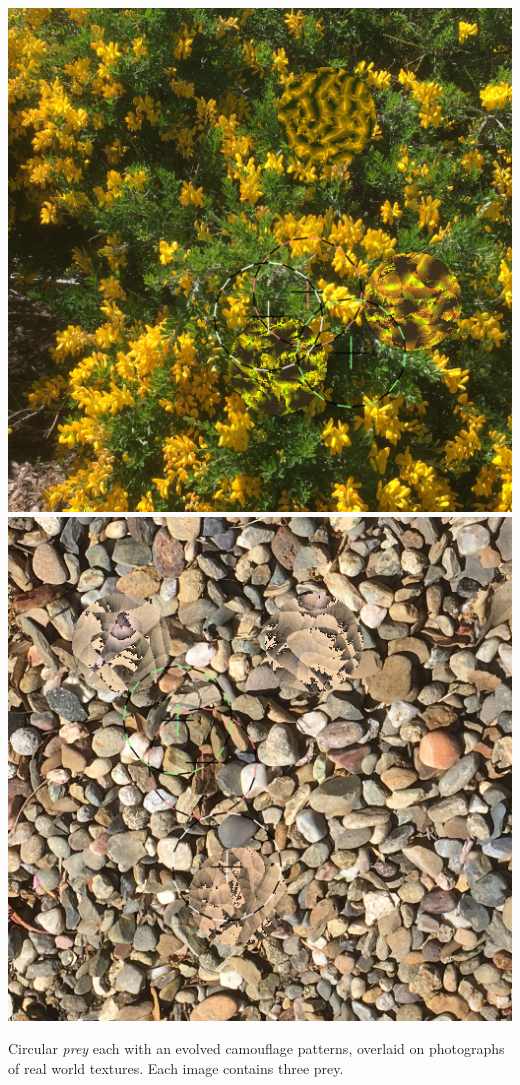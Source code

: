 \documentclass[sigconf]{acmart}
\begin{document}
\begin{teaserfigure}
    \hfill
    \includegraphics[scale=0.24]{images/20220930_step_6093.png}
    \hfill
    \includegraphics[scale=0.24]{images/20221003_step_3667.png}
    \caption{Circular \textit{prey} each with an evolved camouflage patterns, overlaid on photographs of real world textures. Each image contains three prey.}
    \label{fig:teaser}
    \vspace{5mm} %
\end{teaserfigure}
\end{document}
